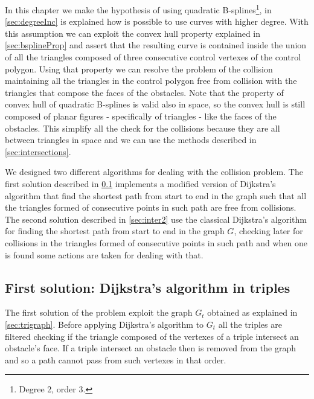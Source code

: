 \documentclass[dissertation.tex]{subfiles}
\begin{document}
In this chapter we make the hypothesis of using
quadratic B-splines\footnote{Degree 2, order 3.}, in
\cref{sec:degreeInc} is explained how is possible to use curves with
higher degree. With this assumption we can exploit the convex hull
property explained in \cref{sec:bsplineProp} and assert that the
resulting curve is contained inside the union of all the triangles
composed of three consecutive control vertexes of the control
polygon. Using that property we can resolve the problem of the
collision maintaining all the triangles in the control polygon free
from collision with the triangles that compose the faces of the
obstacles. Note that the property of convex hull of quadratic
B-splines is valid also in space, so the convex hull is still composed
of planar figures - specifically of triangles - like the faces of the
obstacles. This simplify all the check for the collisions because they
are all between triangles in space and we can use the methods
described in \cref{sec:intersections}.

We designed two different algorithms for dealing with the collision
problem. The first solution described in \cref{sec:inter1} implements
a modified version of Dijkstra's
algorithm that find the shortest path from start to end in the graph
such that all the triangles formed of consecutive points in such path
are free from collisions. The second solution described in
\cref{sec:inter2} use the classical Dijkstra's algorithm for finding
the shortest path from start to end in the graph $G$, checking later for
collisions in the triangles formed of consecutive points in such path
and when one is found some actions are taken for dealing with that.

\subsection{First solution: Dijkstra's algorithm in triples}\label{sec:inter1}
The first solution of the problem exploit the graph $G_t$ obtained as
explained in \cref{sec:trigraph}. Before applying Dijkstra's algorithm
to $G_t$ all the triples are filtered checking if the
triangle composed of the vertexes of a triple intersect an obstacle's
face. If a triple intersect an obstacle then is removed from the graph
and so a path cannot pass from such vertexes in that order.
\end{document}
